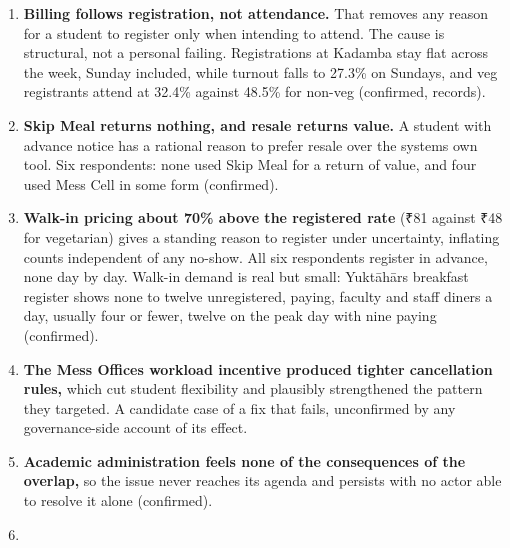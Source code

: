 \documentclass[
  10pt,
  table]{article}
\newcounter{none} %
\providecommand{\tightlist}{%
  \setlength{\itemsep}{0pt}\setlength{\parskip}{0pt}}
\renewcommand{\tightlist}{\setlength{\itemsep}{1.5pt}\setlength{\parskip}{0pt}}
\begin{document}
\begin{enumerate}
\def\labelenumi{\arabic{enumi}.}
\tightlist
\item
  \textbf{Billing follows registration, not attendance.} That removes any reason for a student to register only when intending to attend. The cause is structural, not a personal failing. Registrations at Kadamba stay flat across the week, Sunday included, while turnout falls to 27.3\% on Sundays, and veg registrants attend at 32.4\% against 48.5\% for non-veg (confirmed, records).
\item
  \textbf{Skip Meal returns nothing, and resale returns value.} A student with advance notice has a rational reason to prefer resale over the system\textquotesingle s own tool. Six respondents: none used Skip Meal for a return of value, and four used Mess Cell in some form (confirmed).
\item
  \textbf{Walk-in pricing about 70\% above the registered rate} (₹81 against ₹48 for vegetarian) gives a standing reason to register under uncertainty, inflating counts independent of any no-show. All six respondents register in advance, none day by day. Walk-in demand is real but small: Yuktāhār\textquotesingle s breakfast register shows none to twelve unregistered, paying, faculty and staff diners a day, usually four or fewer, twelve on the peak day with nine paying (confirmed).
\item
  \textbf{The Mess Office\textquotesingle s workload incentive produced tighter cancellation rules,} which cut student flexibility and plausibly strengthened the pattern they targeted. A candidate case of a fix that fails, unconfirmed by any governance-side account of its effect.
\item
  \textbf{Academic administration feels none of the consequences of the overlap,} so the issue never reaches its agenda and persists with no actor able to resolve it alone (confirmed).
\item

\end{enumerate}
\end{document}
